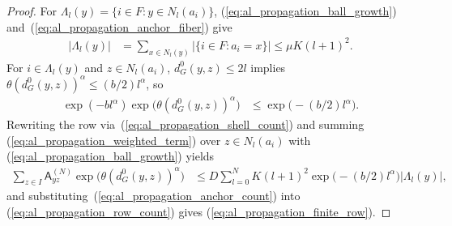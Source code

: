 \begin{proof}
    \leanok
    For $\Lambda_l(y)=\{i\in F:y\in N_l(a_i)\}$,
    (\ref{eq:al_propagation_ball_growth})
    and~(\ref{eq:al_propagation_anchor_fiber}) give
    \begin{align}
        \label{eq:al_propagation_anchor_count}
        |\Lambda_l(y)|
         & =\sum_{x\in N_l(y)}|\{i\in F:a_i=x\}|
        \le\mu K(l+1)^2.
    \end{align}
    For $i\in\Lambda_l(y)$ and $z\in N_l(a_i)$, $d_G^0(y,z)\le2l$ implies
    $\theta(d_G^0(y,z))^\alpha\le(b/2)l^\alpha$, so
    \begin{align}
        \label{eq:al_propagation_weighted_term}
        \exp(-bl^\alpha)\exp\bigl(\theta(d_G^0(y,z))^\alpha\bigr)
         & \le\exp\bigl(-(b/2)l^\alpha\bigr).
    \end{align}
    Rewriting the row via~(\ref{eq:al_propagation_shell_count}) and summing
    (\ref{eq:al_propagation_weighted_term}) over $z\in N_l(a_i)$ with
    (\ref{eq:al_propagation_ball_growth}) yields
    \begin{align}
        \label{eq:al_propagation_row_count}
        \sum_{z\in I}\mathsf A^{(N)}_{yz}
        \exp\bigl(\theta(d_G^0(y,z))^\alpha\bigr)
         & \le D\sum_{l=0}^{N}K(l+1)^2
        \exp\bigl(-(b/2)l^\alpha\bigr)|\Lambda_l(y)|,
    \end{align}
    and substituting~(\ref{eq:al_propagation_anchor_count}) into
    (\ref{eq:al_propagation_row_count}) gives
    (\ref{eq:al_propagation_finite_row}).
\end{proof}

